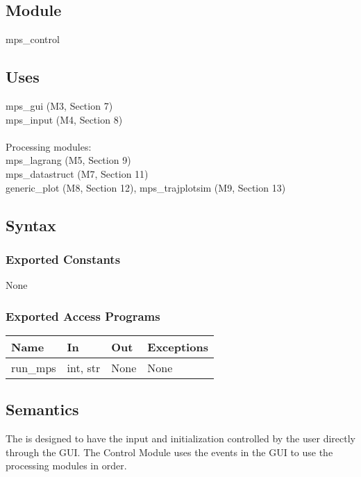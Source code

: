\documentclass[12pt, titlepage]{article}
\begin{document}
\subsection{Module}

mps\_control

\subsection{Uses}

mps\_gui (M3, Section 7)\\
mps\_input (M4, Section 8)\\\\
Processing modules: \\
mps\_lagrang (M5, Section 9)\\
mps\_datastruct (M7, Section 11)\\
generic\_plot (M8, Section 12), mps\_trajplotsim (M9, Section 13) 

\subsection{Syntax}

\subsubsection{Exported Constants}

None

\subsubsection{Exported Access Programs}

\begin{center}
\begin{tabular}{p{2cm} p{4cm} p{4cm} p{2cm}}
\hline
\textbf{Name} & \textbf{In} & \textbf{Out} & \textbf{Exceptions} \\
\hline
run\_mps & int, str & None & None \\
\hline
\end{tabular}
\end{center}

\subsection{Semantics}

The \progname is designed to have the input and initialization controlled by 
the user directly through the GUI.
The \progname Control Module uses the events in the \progname GUI to use the 
processing modules in order.
\end{document}
